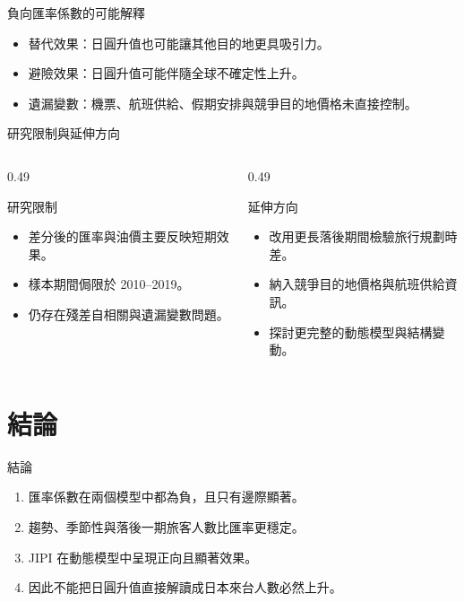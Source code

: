\documentclass[aspectratio=169]{ctexbeamer}
\begin{document}
\begin{frame}{負向匯率係數的可能解釋}
\begin{itemize}
  \item 替代效果：日圓升值也可能讓其他目的地更具吸引力。
  \item 避險效果：日圓升值可能伴隨全球不確定性上升。
  \item 遺漏變數：機票、航班供給、假期安排與競爭目的地價格未直接控制。
\end{itemize}
\end{frame}

\begin{frame}{研究限制與延伸方向}
\begin{columns}[T]
  \begin{column}{0.49\textwidth}
    \begin{block}{研究限制}
    \begin{itemize}
      \item 差分後的匯率與油價主要反映短期效果。
      \item 樣本期間侷限於 2010--2019。
      \item 仍存在殘差自相關與遺漏變數問題。
    \end{itemize}
    \end{block}
  \end{column}
  \begin{column}{0.49\textwidth}
    \begin{block}{延伸方向}
    \begin{itemize}
      \item 改用更長落後期間檢驗旅行規劃時差。
      \item 納入競爭目的地價格與航班供給資訊。
      \item 探討更完整的動態模型與結構變動。
    \end{itemize}
    \end{block}
  \end{column}
\end{columns}
\end{frame}

\section{結論}

\begin{frame}{結論}
\begin{enumerate}
  \item 匯率係數在兩個模型中都為負，且只有邊際顯著。
  \item 趨勢、季節性與落後一期旅客人數比匯率更穩定。
  \item JIPI 在動態模型中呈現正向且顯著效果。
  \item 因此不能把日圓升值直接解讀成日本來台人數必然上升。
\end{enumerate}
\end{frame}
\end{document}
